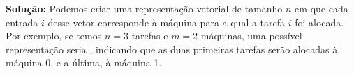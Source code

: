 \noindent \textbf{Solução:}
Podemos criar uma representação vetorial de tamanho $n$ em que cada entrada $i$ desse vetor corresponde à máquina para a qual a tarefa $i$ foi alocada. Por exemplo, se temos $n = 3$ tarefas e $m = 2$ máquinas, uma possível representação seria   , indicando que as duas primeiras tarefas serão alocadas à máquina 0, e a última, à máquina 1.